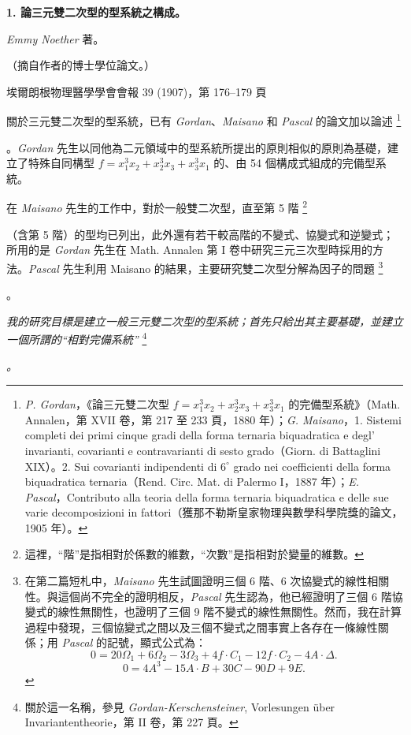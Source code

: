 \documentclass[11pt]{article}
\providecommand{\srcfn}[2]{%
  \begingroup
  \renewcommand{\thefootnote}{#1}%
  \footnote{#2}%
  \addtocounter{footnote}{-1}%
  \endgroup}
\providecommand{\srcspaced}[1]{\emph{#1}}
\providecommand{\glqq}{“}
\providecommand{\grqq}{”}
\begin{document}
\setcounter{footnote}{0}

\begin{center}
{\Large\bfseries 1. 論三元雙二次型的型系統之構成。}\par
\vspace{1.2em}
\srcspaced{Emmy Noether} 著。\par
\vspace{0.8em}
（摘自作者的博士學位論文。）\par
\vspace{1.2em}
埃爾朗根物理醫學學會會報 39 (1907)，第 176--179 頁
\end{center}

關於三元雙二次型的型系統，已有 \srcspaced{Gordan}、\srcspaced{Maisano} 和 \srcspaced{Pascal} 的論文加以論述\srcfn{1)}{\srcspaced{P. Gordan}，《論三元雙二次型 \(f=x_1^3x_2+x_2^3x_3+x_3^3x_1\) 的完備型系統》（Math. Annalen，第 XVII 卷，第 217 至 233 頁，1880 年）；\srcspaced{G. Maisano}，1. Sistemi completi dei primi cinque gradi della forma ternaria biquadratica e degl' invarianti, covarianti e contravarianti di sesto grado（Giorn. di Battaglini XIX）。2. Sui covarianti indipendenti di \(6^\circ\) grado nei coefficienti della forma biquadratica ternaria（Rend. Circ. Mat. di Palermo I，1887 年）；\srcspaced{E. Pascal}，Contributo alla teoria della forma ternaria biquadratica e delle sue varie decomposizioni in fattori（獲那不勒斯皇家物理與數學科學院獎的論文，1905 年）。}。\srcspaced{Gordan} 先生以同他為二元領域中的型系統所提出的原則相似的原則為基礎，建立了特殊自同構型 \(f=x_1^3x_2+x_2^3x_3+x_3^3x_1\) 的、由 54 個構成式組成的完備型系統。

在 \srcspaced{Maisano} 先生的工作中，對於一般雙二次型，直至第 5 階\srcfn{2)}{這裡，\glqq{}階\grqq{}是指相對於係數的維數，\glqq{}次數\grqq{}是指相對於變量的維數。}（含第 5 階）的型均已列出，此外還有若干較高階的不變式、協變式和逆變式；所用的是 \srcspaced{Gordan} 先生在 Math. Annalen 第 I 卷中研究三元三次型時採用的方法。\srcspaced{Pascal} 先生利用 Maisano 的結果，主要研究雙二次型分解為因子的問題\srcfn{1)}{在第二篇短札中，\srcspaced{Maisano} 先生試圖證明三個 6 階、6 次協變式的線性相關性。與這個尚不完全的證明相反，\srcspaced{Pascal} 先生認為，他已經證明了三個 6 階協變式的線性無關性，也證明了三個 9 階不變式的線性無關性。然而，我在計算過程中發現，三個協變式之間以及三個不變式之間事實上各存在一條線性關係；用 \srcspaced{Pascal} 的記號，顯式公式為：
\[
0=20\Omega_1+6\Omega_2-3\Omega_3+4f\cdot C_1-12f\cdot C_2-4A\cdot\Delta.
\]
\[
0=4A^3-15A\cdot B+30C-90D+9E.
\]}。

\srcspaced{我的研究目標是建立一般三元雙二次型的型系統；首先只給出其主要基礎，並建立一個所謂的\glqq{}相對完備系統\grqq{}}\srcfn{2)}{關於這一名稱，參見 \srcspaced{Gordan-Kerschensteiner}, Vorlesungen über Invariantentheorie，第 II 卷，第 227 頁。}\srcspaced{。}
\end{document}
